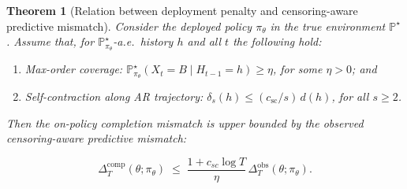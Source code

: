 \documentclass[10pt,a4paper]{amsart}
\newtheorem{theorem}{Theorem}
\renewcommand{\P}{\mathbb{P}}
\begin{document}
\begin{theorem}[Relation between deployment penalty and censoring-aware predictive mismatch]
\label{thm:completion_to_ovserved}
Consider the deployed policy $\pi_\theta$ in the true environment $\P^\star$.
Assume that, for $\P^\star_{\pi_\theta}$-a.e.\ history $h$ and all $t$ the following hold:
\begin{enumerate}
\item Max-order coverage: $\P^\star_{\pi_\theta}(X_t=B\mid H_{t-1}=h)\ge \eta$, for some $\eta>0$; and
\item Self-contraction along AR trajectory: $\delta_s(h)\le (c_{\mathrm{sc}}/s)\,d(h)$, for all $s\ge 2$.
\end{enumerate}


Then the on-policy completion mismatch is upper bounded by the observed censoring-aware predictive mismatch:



\begin{equation}
\label{eq:completion_to_ovserved}
\Delta_T^{\mathrm{comp}}(\theta;\pi_\theta)
\;\le\; \frac{1 + c_{sc} \log T}{\eta}\,\Delta_T^{\mathrm{obs}}(\theta;\pi_\theta).
\end{equation}
\end{theorem}
\end{document}
